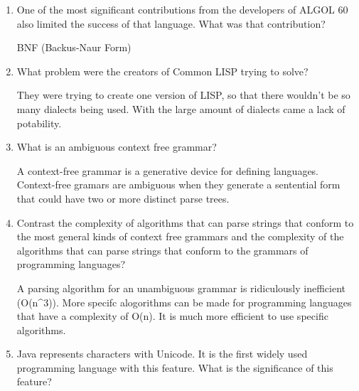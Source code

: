 \begin{enumerate}
\begin{answer}
    \end{answer}


  \item One of the most significant contributions from the developers
    of ALGOL 60 also limited the success of that language. What was
    that contribution?

  \begin{answer}

    BNF (Backus-Naur Form)

    \end{answer}

  \item What problem were the creators of Common LISP trying to solve?

  \begin{answer}

    They were trying to create one version of LISP, so that there wouldn't be so many dialects being used.  With the large amount of dialects came a lack of potability.

    \end{answer}

  \item What is an ambiguous context free grammar?

  \begin{answer}

    A context-free grammar is a generative device for defining languages. Context-free gramars are ambiguous when they generate a sentential form that could have two or more distinct parse trees.

    \end{answer}

  \item Contrast the complexity of algorithms that can parse strings
    that conform to the most general kinds of context free grammars
    and the complexity of the algorithms that can parse strings that
    conform to the grammars of programming languages?

  \begin{answer}

    A parsing algorithm for an unambiguous grammar is ridiculously inefficient (O(n^3)).  More specifc alogorithms can be made for programming languages that have a complexity of O(n).  It is much more efficient to use specific algorithms.  

    \end{answer}

  \item Java represents characters with Unicode. It is the first
    widely used programming language with this feature. What is the
    significance of this feature?


\end{enumerate}
